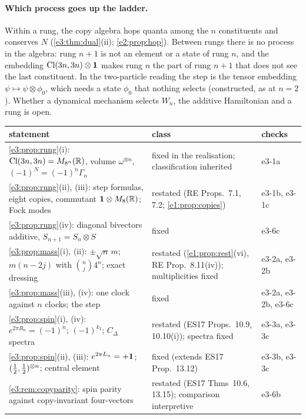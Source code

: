 \paragraph{Which process goes up the ladder.} Within a rung, the copy algebra hops quanta among the $n$ constituents and conserves $N$
(\cref{e3:thm:dual}(ii); \cref{e2:prop:hop}). Between rungs there is no process in the algebra: rung $n+1$ is not an element or a state of
rung $n$, and the embedding $\mathrm{Cl}(3n,3n)\otimes\mathbf 1$ makes rung $n$ the part of rung $n+1$ that does not see the last constituent. In the
two-particle reading the step is the tensor embedding $\psi\mapsto\psi\otimes\phi_0$, which needs a state $\phi_0$ that nothing selects
(constructed, as at $n=2$). Whether a dynamical mechanism selects $W_n$, the additive Hamiltonian and a rung is open.

\begin{table}[!htbp]
\centering
\footnotesize
\begin{tabular}{@{}>{\raggedright\arraybackslash}p{8.2cm}>{\raggedright\arraybackslash}p{4.5cm}>{\raggedright\arraybackslash}p{2.2cm}@{}}
\toprule
statement & class & checks\\
\midrule
\cref{e3:prop:rung}(i): $\mathrm{Cl}(3n,3n)=M_{8^n}(\mathbb{R})$, volume $\omega^{\otimes n}$, $(-1)^N=(-1)^n\Gamma_n$ & fixed in the realisation; classification inherited & e3-1a\\
\cref{e3:prop:rung}(ii), (iii): step formulas, eight copies, commutant $\mathbf 1\otimes M_8(\mathbb{R})$; Fock modes & restated (RE Props.~7.1, 7.2; \cref{e1:prop:copies}) & e3-1b, e3-1c\\
\cref{e3:prop:rung}(iv): diagonal bivectors additive, $S_{n+1}=S_n\otimes S$ & fixed & e3-6c\\
\cref{e3:prop:mass}(i), (ii): $\pm\sqrt n\,m$; $m(n-2j)$ with $\binom nj4^n$; exact dressing & restated (\cref{e1:prop:rest}(vi), RE Prop.~8.11(iv)); multiplicities fixed & e3-2a, e3-2b\\
\cref{e3:prop:mass}(iii), (iv): one clock against $n$ clocks; the step & fixed & e3-2a, e3-2b, e3-6c\\
\cref{e3:prop:spin}(i), (iv): $e^{2\pi R_n}=(-1)^n$; $(-1)^{k_I}$; $C_\Delta$ spectra & restated (ES17 Props.~10.9, 10.10(i)); spectra fixed & e3-3a, e3-3c\\
\cref{e3:prop:spin}(ii), (iii): $e^{2\pi L_n}=+\mathbf 1$; $(\tfrac12,\tfrac12)^{\otimes n}$; central element & fixed (extends ES17 Prop.~13.12) & e3-3b, e3-3c\\
\cref{e3:rem:copyparity}: spin parity against copy-invariant four-vectors & restated (ES17 Thms~10.6, 13.15); comparison interpretive & e3-6b\\

\end{tabular}
\end{table}
